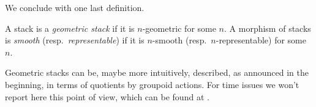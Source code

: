         We conclude with one last definition.
        \begin{defn}
            \label{defn:smooth_maps}
            A stack is a \emph{geometric stack} if it is $n$-geometric for some $n$.
            A morphism of stacks is \emph{smooth} (resp.\ \emph{representable}) if it is $n$-smooth (resp.\ $n$-representable) for some $n$.
        \end{defn}

        Geometric stacks can be, maybe more intuitively, described, as announced in the beginning, in terms of quotients by groupoid actions. For time issues we won't report here this point of view, which can be found at \cite[1.3.4, 1.3.5]{ToVe:hag2}.
